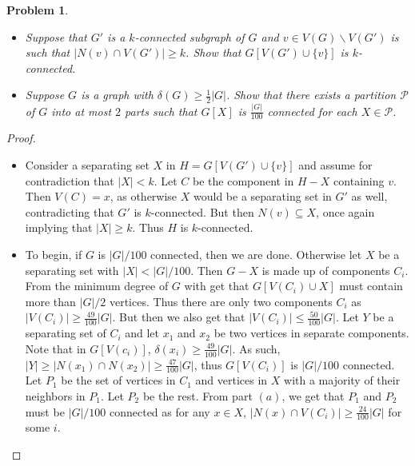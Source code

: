 \documentclass[12pt]{article}
\newtheorem{problem}{Problem}
\begin{document}
\begin{problem}
  \begin{itemize}
  \item[(a)] Suppose that $G'$ is a $k$-connected subgraph of $G$ and
    $v \in V(G) \backslash V(G')$ is such that
    $|N(v) \cap V(G')| \geq k$. Show that $G[V(G') \cup \{ v\}]$ is
    $k$-connected.
  \item[(b)] Suppose $G$ is a graph with
    $\delta(G) \geq \frac{1}{2}|G|$. Show that there exists a
    partition $\mathcal{P}$ of $G$ into at most $2$ parts such that
    $G[X]$ is $\frac{|G|}{100}$ connected for each
    $X \in \mathcal{P}$.
  \end{itemize}
\end{problem}
\begin{proof}
  \begin{itemize}
  \item[(a)] Consider a separating set $X$ in
    $H = G[V(G') \cup \{ v \}]$ and assume for contradiction that
    $|X| < k$. Let $C$ be the component in $H - X$ containing
    $v$. Then $V(C) = x$, as otherwise $X$ would be a separating set
    in $G'$ as well, contradicting that $G'$ is $k$-connected. But
    then $N(v) \subseteq X$, once again implying that $|X| \geq
    k$. Thus $H$ is $k$-connected.
  \item[(b)] To begin, if $G$ is $|G|/100$ connected, then we are
    done. Otherwise let $X$ be a separating set with $|X| <
    |G|/100$. Then $G-X$ is made up of components $C_i$. From the
    minimum degree of $G$ with get that $G[V(C_i) \cup X]$ must
    contain more than $|G|/2$ vertices. Thus there are only two
    components $C_i$ as $|V(C_i)| \geq \frac{49}{100} |G|$. But then
    we also get that $|V(C_i)| \leq \frac{50}{100} |G|$. Let $Y$ be a
    separating set of $C_i$ and let $x_1$ and $x_2$ be two vertices in
    separate components. Note that in $G[V(c_i)]$,
    $\delta(x_i) \geq \frac{49}{100} |G|$. As such,
    $|Y| \geq |N(x_1) \cap N(x_2)| \geq \frac{47}{100} |G|$, thus
    $G[V(C_i)]$ is $|G|/100$ connected. Let $P_1$ be the set of
    vertices in $C_1$ and vertices in $X$ with a majority of their
    neighbors in $P_1$. Let $P_2$ be the rest. From part $(a)$, we get
    that $P_1$ and $P_2$ must be $|G|/100$ connected as for any
    $x \in X$, $|N(x) \cap V(C_i)| \geq \frac{24}{100} |G|$ for some
    $i$.
  \end{itemize}
\end{proof}
\end{document}
